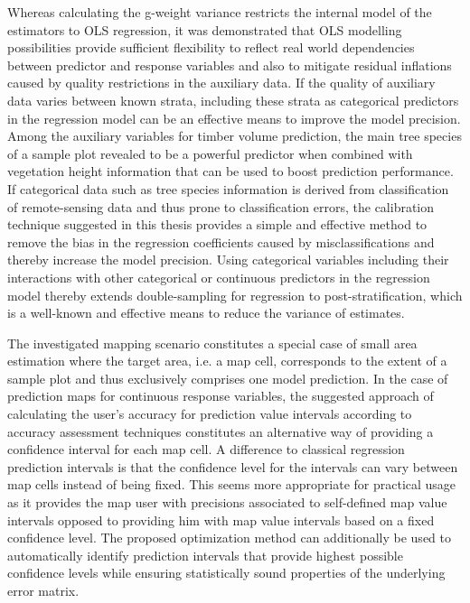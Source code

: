 
Whereas calculating the g-weight variance restricts the internal model of the estimators to OLS regression, it was demonstrated that OLS modelling possibilities provide sufficient flexibility to reflect real world dependencies between predictor and response variables and also to mitigate residual inflations caused by quality restrictions in the auxiliary data. If the quality of auxiliary data varies between known strata, including these strata as categorical predictors in the regression model can be an effective means to improve the model precision. Among the auxiliary variables for timber volume prediction, the main tree species of a sample plot revealed to be a powerful predictor when combined with vegetation height information that can be used to boost prediction performance. If categorical data such as tree species information is derived from classification of remote-sensing data and thus prone to classification errors, the calibration technique suggested in this thesis provides a simple and effective method to remove the bias in the regression coefficients caused by misclassifications and thereby increase the model precision. Using categorical variables including their interactions with other categorical or continuous predictors in the regression model thereby extends double-sampling for regression to post-stratification, which is a well-known and effective means to reduce the variance of estimates.\par

The investigated mapping scenario constitutes a special case of small area estimation where the target area, i.e. a map cell, corresponds to the extent of a sample plot and thus exclusively comprises one model prediction. In the case of prediction maps for continuous response variables, the suggested approach of calculating the user's accuracy for prediction value intervals according to accuracy assessment techniques constitutes an alternative way of providing a confidence interval for each map cell. A difference to classical regression prediction intervals is that the confidence level for the intervals can vary between map cells instead of being fixed. This seems more appropriate for practical usage as it provides the map user with precisions associated to self-defined map value intervals opposed to providing him with map value intervals based on a fixed confidence level. The proposed optimization method can additionally be used to automatically identify prediction intervals that provide highest possible confidence levels while ensuring statistically sound properties of the underlying error matrix. 

